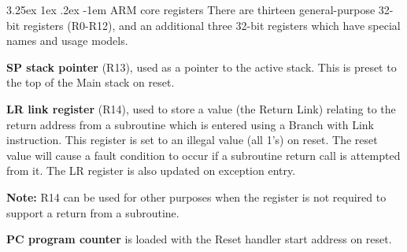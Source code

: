 \documentclass{report}
\makeatletter
\renewcommand\subparagraph{\@startsection{subparagraph}{6}{\parindent}%
	{3.25ex \@plus1ex \@minus .2ex}%
	{-1em}%
	{\normalfont\normalsize\bfseries}}
\makeatother
\begin{document}
		\subparagraph{ARM core registers} There are thirteen general-purpose 32-bit registers (R0-R12), and an additional three 32-bit registers which have special names and usage models.
		\par \textbf{SP stack pointer} (R13), used as a pointer to the active stack. This is preset to the top of the Main stack on
		reset.
		\par \textbf{LR link register} (R14), used to store a value (the Return Link) relating to the return address from a subroutine which is entered using a Branch with Link instruction. This register is set to an illegal value (all 1’s) on reset. The reset value will cause a fault condition to occur if a subroutine return call is attempted from it. The LR register is also updated on exception
		entry.
		\par \textbf{Note:} R14 can be used for other purposes when the register is not required to support a return from
		a subroutine.
		\par \textbf{PC program counter} is loaded with the Reset handler start address on reset.
		
\end{document}
